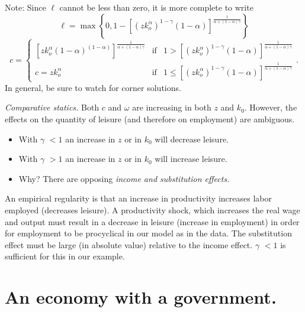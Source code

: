 \documentclass{sebase}
\begin{document}
Note: Since $\ell $ cannot be less than zero, it is more complete to write 
\begin{equation*}
\ell =\max \left\{ 0,1-\left[ \left( zk_{o}^{\alpha }\right) ^{1-\gamma
}\left( 1-\alpha \right) \right] ^{\frac{1}{\alpha +\left( 1-\alpha \right)
\gamma }}\right\}
\end{equation*}%
\begin{equation*}
c=\left\{ 
\begin{array}{ccc}
\left[ zk_{o}^{\alpha }\left( 1-\alpha \right) ^{\left( 1-\alpha \right) }%
\right] ^{\frac{1}{\alpha +\left( 1-\alpha \right) \gamma }} & \text{if} & 
1> \left[ \left( zk_{o}^{\alpha }\right) ^{1-\gamma }\left( 1-\alpha \right) %
\right] ^{\frac{1}{\alpha +\left( 1-\alpha \right) \gamma }} \\ 
c=zk_{o}^{\alpha } & \text{if} & 1\leq \left[ \left( zk_{o}^{\alpha }\right)
^{1-\gamma }\left( 1-\alpha \right) \right] ^{\frac{1}{\alpha +\left(
1-\alpha \right) \gamma }}%
\end{array}%
\right. .
\end{equation*}%
In general, be sure to watch for corner solutions.\pagebreak

\textit{Comparative statics. }Both $c$ and $\omega $ are increasing in both $%
z$ and $k_{0}$. However, the effects on the quantity of leisure (and
therefore on employment) are ambiguous.

\begin{itemize}
\item With $\gamma $ $<1$ an increase in $z$ or in $k_{0}$ will decrease
leisure.

\item With $\gamma $ $>1$ an increase in $z$ or in $k_{0}$ will increase
leisure.

\item Why? There are opposing \textit{income and substitution effects. }
\end{itemize}

An empirical regularity is that an increase in productivity increases labor
employed (decreases leisure). A productivity shock, which increases the real
wage and output must result in a decrease in leisure (increase in
employment) in order for employment to be procyclical in our model as in the
data. The substitution effect must be large (in absolute value) relative to
the income effect. $\gamma $ $<1$ is sufficient for this in our example.

\pagebreak

\section{An economy with a government.}
\end{document}
